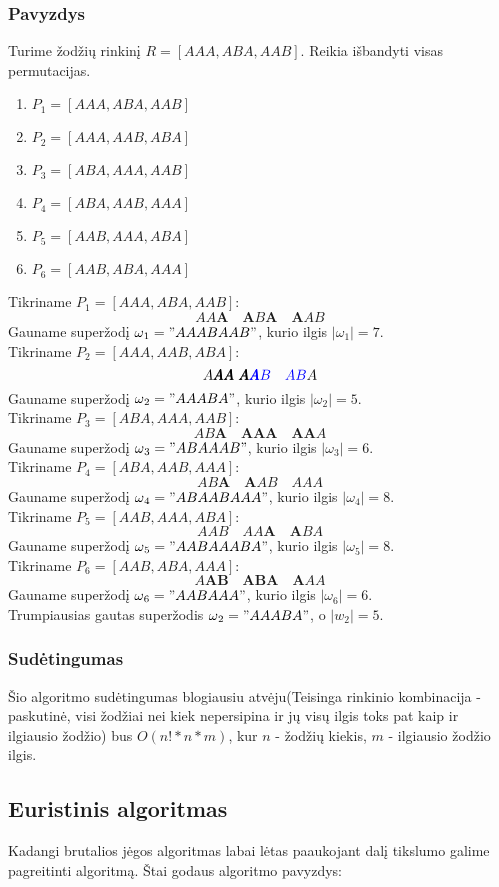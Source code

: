 \documentclass{VUMIFInfKursinis}
\begin{document}
\subsubsection{Pavyzdys}
Turime žodžių rinkinį $R=[AAA, ABA, AAB]$. Reikia išbandyti visas permutacijas. 
\begin{enumerate}
  \item{$P_1 =[AAA, ABA, AAB]$}
  \item{$P_2 =[AAA, AAB, ABA]$}
  \item{$P_3 =[ABA, AAA, AAB]$}
  \item{$P_4 =[ABA, AAB, AAA]$}
  \item{$P_5 =[AAB, AAA, ABA]$}
  \item{$P_6 =[AAB, ABA, AAA]$}
\end{enumerate}
Tikriname $P_1 =[AAA, ABA, AAB]$:
\[AA\pmb{A}\quad{}\pmb{A}B\pmb{A}\quad{}\pmb{A}AB\]
Gauname superžodį $\omega{}_1 = "AAABAAB"$, kurio ilgis $|\omega{}_1| = 7$.\\
Tikriname $P_2 =[AAA, AAB, ABA]$:
\[A\pmb{AA} ~ \pmb{A\textcolor{blue}{A}}\textcolor{blue}{B} \quad{} \textcolor{blue}{AB}A\]
Gauname superžodį $\omega{}_2 = "AAABA"$, kurio ilgis $|\omega{}_2| = 5$.\\
Tikriname $P_3 =[ABA, AAA, AAB]$:
\[AB\pmb{A}\quad{}\pmb{A}\pmb{AA}\quad{}\pmb{AA}A\]
Gauname superžodį $\omega{}_3 = "ABAAAB"$, kurio ilgis $|\omega{}_3| = 6$.\\
Tikriname $P_4 =[ABA, AAB, AAA]$:
\[AB\pmb{A}\quad{}\pmb{A}AB\quad{}AAA\]
Gauname superžodį $\omega{}_4 = "ABAABAAA"$, kurio ilgis $|\omega{}_4| = 8$.\\
Tikriname $P_5 =[AAB, AAA, ABA]$:
\[AAB\quad{}AA\pmb{A}\quad{}\pmb{A}BA\]
Gauname superžodį $\omega{}_5 = "AABAAABA"$, kurio ilgis $|\omega{}_5| = 8$.\\
Tikriname $P_6 =[AAB, ABA, AAA]$:
\[A\pmb{AB}\quad{}\pmb{AB}\pmb{A}\quad{}\pmb{A}AA\]
Gauname superžodį $\omega{}_6 = "AABAAA"$, kurio ilgis $|\omega{}_6| = 6$.\\
Trumpiausias gautas superžodis $\omega{}_2 = "AAABA"$, o $|w_2|=5$.
\subsubsection{Sudėtingumas}
Šio algoritmo sudėtingumas blogiausiu atvėju(Teisinga rinkinio kombinacija - paskutinė, visi žodžiai nei kiek nepersipina ir jų visų ilgis toks pat kaip ir ilgiausio žodžio) bus $O(n! * n * m)$, kur $n$ - žodžių kiekis, $m$ - ilgiausio žodžio ilgis.

\subsection{Euristinis algoritmas}
Kadangi brutalios jėgos algoritmas labai lėtas paaukojant dalį tikslumo galime pagreitinti algoritmą. Štai godaus algoritmo pavyzdys:
\end{document}
